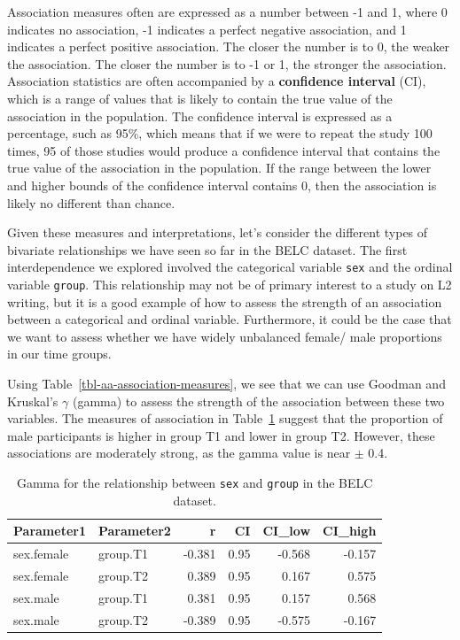\documentclass[
  letterpaper,
  DIV=11,
  numbers=noendperiod]{scrreport}
\theoremstyle{definition}
\theoremstyle{remark}
\begin{document}
Association measures often are expressed as a number between -1 and 1,
where 0 indicates no association, -1 indicates a perfect negative
association, and 1 indicates a perfect positive association. The closer
the number is to 0, the weaker the association. The closer the number is
to -1 or 1, the stronger the association. Association statistics are
often accompanied by a \textbf{confidence interval} (CI), which is a
range of values that is likely to contain the true value of the
association in the population. The confidence interval is expressed as a
percentage, such as 95\%, which means that if we were to repeat the
study 100 times, 95 of those studies would produce a confidence interval
that contains the true value of the association in the population. If
the range between the lower and higher bounds of the confidence interval
contains 0, then the association is likely no different than chance.

Given these measures and interpretations, let's consider the different
types of bivariate relationships we have seen so far in the BELC
dataset. The first interdependence we explored involved the categorical
variable \texttt{sex} and the ordinal variable \texttt{group}. This
relationship may not be of primary interest to a study on L2 writing,
but it is a good example of how to assess the strength of an association
between a categorical and ordinal variable. Furthermore, it could be the
case that we want to assess whether we have widely unbalanced female/
male proportions in our time groups.

Using Table~\ref{tbl-aa-association-measures}, we see that we can use
Goodman and Kruskal's \(\gamma\) (gamma) to assess the strength of the
association between these two variables. The measures of association in
Table~\ref{tbl-aa-gamma} suggest that the proportion of male
participants is higher in group T1 and lower in group T2. However, these
associations are moderately strong, as the gamma value is near \(\pm\)
0.4.

\hypertarget{tbl-aa-gamma}{}
\begin{table}
\caption{\label{tbl-aa-gamma}Gamma for the relationship between \texttt{sex} and \texttt{group} in
the BELC dataset. }\tabularnewline

\centering
\begin{tabular}{l|l|r|r|r|r}
\hline
Parameter1 & Parameter2 & r & CI & CI\_low & CI\_high\\
\hline
sex.female & group.T1 & -0.381 & 0.95 & -0.568 & -0.157\\
\hline
sex.female & group.T2 & 0.389 & 0.95 & 0.167 & 0.575\\
\hline
sex.male & group.T1 & 0.381 & 0.95 & 0.157 & 0.568\\
\hline
sex.male & group.T2 & -0.389 & 0.95 & -0.575 & -0.167\\
\hline
\end{tabular}
\end{table}
\end{document}
